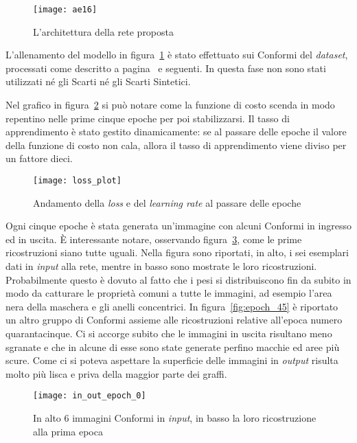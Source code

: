 \begin{figure}[ht]
  \begin{center}
    \texttt{[image: ae16]}
    \caption{L'architettura della rete proposta}
    \label{fig:ae16_arch}
  \end{center}
\end{figure}

L'allenamento del modello in figura~\ref{fig:ae16_arch} è stato effettuato sui Conformi del \textit{dataset}, processati come descritto a pagina~\pageref{prep} e seguenti.
In questa fase non sono stati utilizzati né gli Scarti né gli Scarti Sintetici.

Nel grafico in figura~\ref{fig:loss_plot} si può notare come la funzione di costo scenda in modo repentino nelle prime cinque epoche per poi stabilizzarsi.
Il tasso di apprendimento è stato gestito dinamicamente: se al passare delle epoche il valore della funzione di costo non cala, allora il tasso di apprendimento viene diviso per un fattore dieci.

\begin{figure}[ht] %
  \begin{center}
    \texttt{[image: loss\_plot]}
    \caption{Andamento della \textit{loss} e del \textit{learning rate} al passare delle epoche}
    \label{fig:loss_plot}
  \end{center}
\end{figure}

Ogni cinque epoche è stata generata un'immagine con alcuni Conformi in ingresso  ed in uscita.
È interessante notare, osservando figura~\ref{fig:epoch_0}, come le prime ricostruzioni siano tutte uguali.
Nella figura sono riportati, in alto, i sei esemplari dati in \textit{input} alla rete, mentre in basso sono mostrate le loro ricostruzioni.
Probabilmente questo è dovuto al fatto che i pesi si distribuiscono fin da subito in modo da catturare le proprietà comuni a tutte le immagini, ad esempio l'area nera della maschera e gli anelli concentrici.
In figura~\ref{fig:epoch_45} è riportato un altro gruppo di Conformi assieme alle ricostruzioni relative all'epoca numero quarantacinque.
Ci si accorge subito che le immagini in uscita risultano meno sgranate e che in alcune di esse sono state generate perfino macchie ed aree più scure.
Come ci si poteva aspettare la superficie delle immagini in \textit{output} risulta molto più lisca e priva della maggior parte dei graffi.

\begin{figure}[ht] %
  \begin{center}
    \texttt{[image: in\_out\_epoch\_0]}
    \caption{In alto 6 immagini Conformi in \textit{input}, in basso la loro ricostruzione alla prima epoca}
    \label{fig:epoch_0}
  \end{center}
\end{figure}

